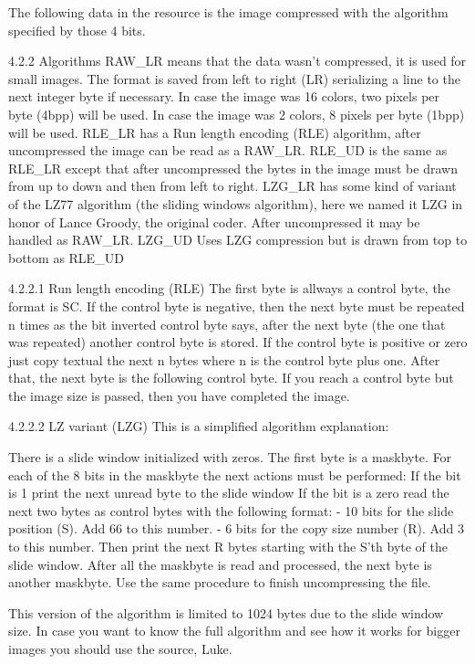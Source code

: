  The following data in the resource is the image compressed with the
 algorithm specified by those 4 bits.

4.2.2 Algorithms
 RAW_LR means that the data wasn't compressed, it is used for small images.
        The format is saved from left to right (LR) serializing a line to
        the next integer byte if necessary. In case the image was 16
        colors, two pixels per byte (4bpp) will be used. In case the image
        was 2 colors, 8 pixels per byte (1bpp) will be used.
 RLE_LR has a Run length encoding (RLE) algorithm, after uncompressed the
        image can be read as a RAW_LR.
 RLE_UD is the same as RLE_LR except that after uncompressed the bytes in
 				the image must be drawn from up to down and then from left to right.
 LZG_LR has some kind of variant of the LZ77 algorithm (the sliding windows
        algorithm), here we named it LZG in honor of Lance Groody, the
        original coder.
        After uncompressed it may be handled as RAW_LR.
 LZG_UD Uses LZG compression but is drawn from top to bottom as RLE_UD

4.2.2.1 Run length encoding (RLE)
 The first byte is allways a control byte, the format is SC. If the control
 byte is negative, then the next byte must be repeated n times as the bit
 inverted control byte says, after the next byte (the one that was
 repeated)
 another control byte is stored.
 If the control byte is positive or zero just copy textual the next n bytes
 where n is the control byte plus one. After that, the next byte is the
 following control byte.
 If you reach a control byte but the image size is passed, then you have
 completed the image.

4.2.2.2 LZ variant (LZG)
 This is a simplified algorithm explanation:

 There is a slide window initialized with zeros.
 The first byte is a maskbyte.
 For each of the 8 bits in the maskbyte the next actions must be performed:
  If the bit is 1 print the next unread byte to the slide window
  If the bit is a zero read the next two bytes as control bytes with the
  following format:
   - 10 bits for the slide position (S). Add 66 to this number.
   - 6 bits for the copy size number (R). Add 3 to this number.
   Then print the next R bytes starting with the S'th byte of the slide
   window.
 After all the maskbyte is read and processed, the next byte is another
 maskbyte. Use the same procedure to finish uncompressing the file.

 This version of the algorithm is limited to 1024 bytes due to the slide
 window size. In case you want to know the full algorithm and see how it
 works for bigger images you should use the source, Luke.

